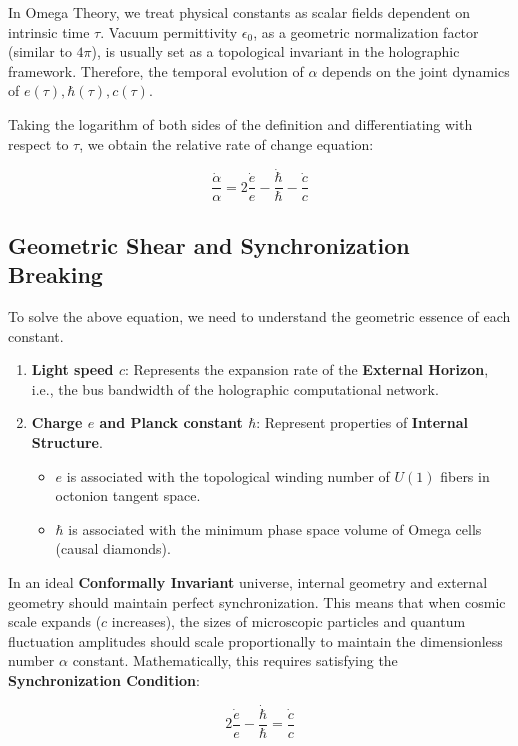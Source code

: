 In Omega Theory, we treat physical constants as scalar fields dependent on intrinsic time $\tau$. Vacuum permittivity $\epsilon_0$, as a geometric normalization factor (similar to $4\pi$), is usually set as a topological invariant in the holographic framework. Therefore, the temporal evolution of $\alpha$ depends on the joint dynamics of $e(\tau), \hbar(\tau), c(\tau)$.

Taking the logarithm of both sides of the definition and differentiating with respect to $\tau$, we obtain the relative rate of change equation:

\[\frac{\dot{\alpha}}{\alpha} = 2\frac{\dot{e}}{e} - \frac{\dot{\hbar}}{\hbar} - \frac{\dot{c}}{c}\]

\subsection{Geometric Shear and Synchronization Breaking}

To solve the above equation, we need to understand the geometric essence of each constant.

\begin{enumerate}
\item \textbf{Light speed $c$}: Represents the expansion rate of the \textbf{External Horizon}, i.e., the bus bandwidth of the holographic computational network.
\item \textbf{Charge $e$ and Planck constant $\hbar$}: Represent properties of \textbf{Internal Structure}.
   \begin{itemize}
   \item $e$ is associated with the topological winding number of $U(1)$ fibers in octonion tangent space.
   \item $\hbar$ is associated with the minimum phase space volume of Omega cells (causal diamonds).
   \end{itemize}
\end{enumerate}

In an ideal \textbf{Conformally Invariant} universe, internal geometry and external geometry should maintain perfect synchronization. This means that when cosmic scale expands ($c$ increases), the sizes of microscopic particles and quantum fluctuation amplitudes should scale proportionally to maintain the dimensionless number $\alpha$ constant.
Mathematically, this requires satisfying the \textbf{Synchronization Condition}:

\[2\frac{\dot{e}}{e} - \frac{\dot{\hbar}}{\hbar} = \frac{\dot{c}}{c}\]


